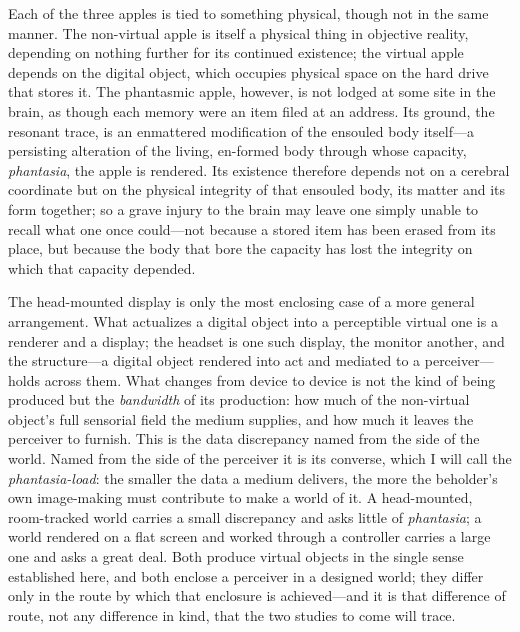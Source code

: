 \documentclass{article}
\begin{document}
Each of the three apples is tied to something physical, though not in the same manner. The non-virtual apple is itself a physical thing in objective reality, depending on nothing further for its continued existence; the virtual apple depends on the digital object, which occupies physical space on the hard drive that stores it. The phantasmic apple, however, is not lodged at some site in the brain, as though each memory were an item filed at an address. Its ground, the resonant trace, is an enmattered modification of the ensouled body itself—a persisting alteration of the living, en-formed body through whose capacity, \textit{phantasia}, the apple is rendered. Its existence therefore depends not on a cerebral coordinate but on the physical integrity of that ensouled body, its matter and its form together; so a grave injury to the brain may leave one simply unable to recall what one once could—not because a stored item has been erased from its place, but because the body that bore the capacity has lost the integrity on which that capacity depended.

The head-mounted display is only the most enclosing case of a more general arrangement. What actualizes a digital object into a perceptible virtual one is a renderer and a display; the headset is one such display, the monitor another, and the structure—a digital object rendered into act and mediated to a perceiver—holds across them. What changes from device to device is not the kind of being produced but the \textit{bandwidth} of its production: how much of the non-virtual object's full sensorial field the medium supplies, and how much it leaves the perceiver to furnish. This is the data discrepancy named from the side of the world. Named from the side of the perceiver it is its converse, which I will call the \textit{phantasia-load}: the smaller the data a medium delivers, the more the beholder's own image-making must contribute to make a world of it. A head-mounted, room-tracked world carries a small discrepancy and asks little of \textit{phantasia}; a world rendered on a flat screen and worked through a controller carries a large one and asks a great deal. Both produce virtual objects in the single sense established here, and both enclose a perceiver in a designed world; they differ only in the route by which that enclosure is achieved—and it is that difference of route, not any difference in kind, that the two studies to come will trace.
\end{document}
